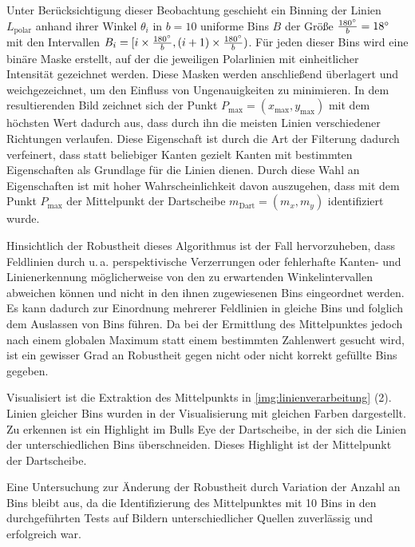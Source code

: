 Unter Berücksichtigung dieser Beobachtung geschieht ein Binning der Linien $L_\text{polar}$ anhand ihrer Winkel $\theta_i$ in $b=10$ uniforme Bins $B$ der Größe $\frac{180^{\circ}}{b}=18^{\circ}$ mit den Intervallen $ B_i = [i \times \frac{180^{\circ}}{b}, (i+1) \times \frac{180^{\circ}}{b})$. Für jeden dieser Bins wird eine binäre Maske erstellt, auf der die jeweiligen Polarlinien mit einheitlicher Intensität gezeichnet werden. Diese Masken werden anschließend überlagert und weichgezeichnet, um den Einfluss von Ungenauigkeiten zu minimieren. In dem resultierenden Bild zeichnet sich der Punkt $P_\text{max} = (x_\text{max}, y_\text{max})$ mit dem höchsten Wert dadurch aus, dass durch ihn die meisten Linien verschiedener Richtungen verlaufen. Diese Eigenschaft ist durch die Art der Filterung dadurch verfeinert, dass statt beliebiger Kanten gezielt Kanten mit bestimmten Eigenschaften als Grundlage für die Linien dienen. Durch diese Wahl an Eigenschaften ist mit hoher Wahrscheinlichkeit davon auszugehen, dass mit dem Punkt $P_\text{max}$ der Mittelpunkt der Dartscheibe $m_\text{Dart}=(m_x, m_y)$ identifiziert wurde.

Hinsichtlich der Robustheit dieses Algorithmus ist der Fall hervorzuheben, dass Feldlinien durch u.\,a. perspektivische Verzerrungen oder fehlerhafte Kanten- und Linienerkennung möglicherweise von den zu erwartenden Winkelintervallen abweichen können und nicht in den ihnen zugewiesenen Bins eingeordnet werden. Es kann dadurch zur Einordnung mehrerer Feldlinien in gleiche Bins und folglich dem Auslassen von Bins führen. Da bei der Ermittlung des Mittelpunktes jedoch nach einem globalen Maximum statt einem bestimmten Zahlenwert gesucht wird, ist ein gewisser Grad an Robustheit gegen nicht oder nicht korrekt gefüllte Bins gegeben.

Visualisiert ist die Extraktion des Mittelpunkts in \autoref{img:linienverarbeitung} (2). Linien gleicher Bins wurden in der Visualisierung mit gleichen Farben dargestellt. Zu erkennen ist ein Highlight im Bulls Eye der Dartscheibe, in der sich die Linien der unterschiedlichen Bins überschneiden. Dieses Highlight ist der Mittelpunkt der Dartscheibe.

Eine Untersuchung zur Änderung der Robustheit durch Variation der Anzahl an Bins bleibt aus, da die Identifizierung des Mittelpunktes mit 10 Bins in den durchgeführten Tests auf Bildern unterschiedlicher Quellen zuverlässig und erfolgreich war.

